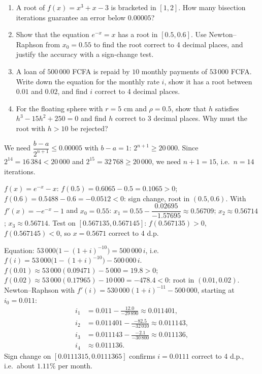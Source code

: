 \documentclass[11pt]{article}
\begin{document}
\begin{exercice}[Practice]
\begin{enumerate}
\item A root of $f(x) = x^3 + x - 3$ is bracketed in $[1, 2]$. How many bisection iterations guarantee an error below $0.00005$?
\item Show that the equation $e^{-x} = x$ has a root in $[0.5, 0.6]$. Use Newton--Raphson from $x_0 = 0.55$ to find the root correct to 4 decimal places, and justify the accuracy with a sign-change test.
\item A loan of $500\,000$ FCFA is repaid by $10$ monthly payments of $53\,000$ FCFA. Write down the equation for the monthly rate $i$, show it has a root between $0.01$ and $0.02$, and find $i$ correct to 4 decimal places.
\item For the floating sphere with $r = 5$ cm and $\rho = 0.5$, show that $h$ satisfies $h^3 - 15h^2 + 250 = 0$ and find $h$ correct to 3 decimal places. Why must the root with $h > 10$ be rejected?
\end{enumerate}
\end{exercice}

\begin{corrige}[Exercise 1]
We need $\dfrac{b-a}{2^{n+1}} \leq 0.00005$ with $b-a = 1$: $2^{n+1} \geq 20\,000$. Since $2^{14} = 16\,384 < 20\,000$ and $2^{15} = 32\,768 \geq 20\,000$, we need $n+1 = 15$, i.e.\ $n = 14$ iterations.
\end{corrige}

\begin{corrige}[Exercise 2]
$f(x) = e^{-x} - x$: $f(0.5) = 0.6065 - 0.5 = 0.1065 > 0$; $f(0.6) = 0.5488 - 0.6 = -0.0512 < 0$: sign change, root in $(0.5, 0.6)$. With $f'(x) = -e^{-x} - 1$ and $x_0 = 0.55$: $x_1 = 0.55 - \dfrac{0.02695}{-1.57695} \approx 0.56709$; $x_2 \approx 0.56714$; $x_3 \approx 0.56714$. Test on $[0.567135, 0.567145]$: $f(0.567135) > 0$, $f(0.567145) < 0$, so $x = 0.5671$ correct to 4 d.p.
\end{corrige}

\begin{corrige}[Exercise 3]
Equation: $53\,000\bigl(1-(1+i)^{-10}\bigr) = 500\,000\, i$, i.e.\ $f(i) = 53\,000\bigl(1-(1+i)^{-10}\bigr) - 500\,000\,i$.
$f(0.01) \approx 53\,000(0.09471) - 5\,000 = 19.8 > 0$; $f(0.02) \approx 53\,000(0.17965) - 10\,000 = -478.4 < 0$: root in $(0.01, 0.02)$.
Newton--Raphson with $f'(i) = 530\,000(1+i)^{-11} - 500\,000$, starting at $i_0 = 0.011$:
\begin{align*}
i_1 &= 0.011 - \frac{12.0}{-29\,890} \approx 0.011401, \\
i_2 &= 0.011401 - \frac{-82.5}{-32\,010} \approx 0.011143, \\
i_3 &= 0.011143 - \frac{-2.1}{-30\,800} \approx 0.011136, \\
i_4 &\approx 0.011136.
\end{align*}
Sign change on $[0.0111315, 0.0111365]$ confirms $i = 0.0111$ correct to 4 d.p., i.e.\ about $1.11\%$ per month.
\end{corrige}
\end{document}
